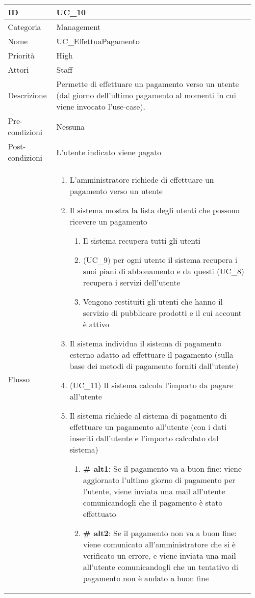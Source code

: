 \begin{center}
\begin{tabular}{ |p{2cm}|p{13.5cm}|  }
\hline
ID & UC\_10 \\\hline
Categoria & Management\\\hline
Nome & UC\_EffettuaPagamento\\\hline
Priorità & High \\\hline
Attori &  Staff \\\hline
Descrizione & Permette di effettuare un pagamento verso un utente (dal giorno dell'ultimo pagamento al momenti in cui viene invocato l'use-case).\\\hline
Pre-condizioni &  Nessuna\\\hline
Post-condizioni &  L'utente indicato viene pagato\\\hline
Flusso &  	
		\begin{enumerate}	
		\item L'amministratore richiede di effettuare un pagamento verso un utente
		\item Il sistema mostra la lista degli utenti che possono ricevere un pagamento
			\begin{enumerate}[  ]
			\item Il sistema recupera tutti gli utenti
			\item (UC\_9) per ogni utente il sistema recupera i suoi piani di abbonamento e da questi (UC\_8) recupera i servizi dell'utente
			\item Vengono restituiti gli utenti che hanno il servizio di pubblicare prodotti e il cui account è attivo
			\end{enumerate}
		\item Il sistema individua il sistema di pagamento esterno adatto ad effettuare il pagamento (sulla base dei metodi di pagamento forniti dall'utente)
		\item (UC\_11) Il sistema calcola l'importo da pagare all'utente
		\item Il sistema richiede al sistema di pagamento di effettuare un pagamento all'utente (con i dati inseriti dall'utente e l'importo calcolato dal sistema)
			\begin{enumerate}[  ]
			\item \textbf{\# alt1}: Se il pagamento va a buon fine: viene aggiornato l'ultimo giorno di pagamento per l'utente, viene inviata una mail all'utente comunicandogli che il pagamento è stato effettuato
			\item \textbf{\# alt2}: Se il pagamento non va a buon fine: viene comunicato all'amministratore che si è verificato un errore, e viene inviata una mail all'utente comunicandogli che un tentativo di pagamento non è andato a buon fine
			\end{enumerate}
		\end{enumerate}\\\hline
\end{tabular}
\label{table_use_case:10}\newline


\end{center}

